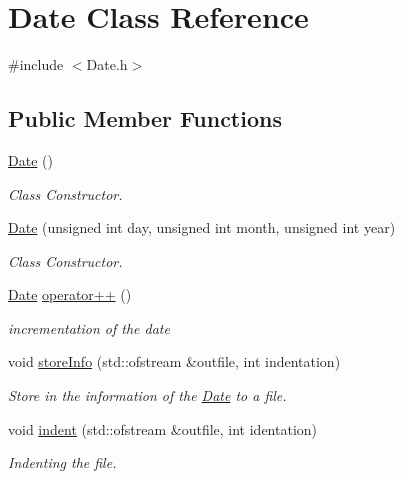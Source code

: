\hypertarget{class_date}{}\section{Date Class Reference}
\label{class_date}


{\ttfamily \#include $<$Date.\+h$>$}

\subsection*{Public Member Functions}
\begin{DoxyCompactItemize}
\item 
\mbox{\label{class_date_a4e59ed4ba66eec61c27460c5d09fa1bd}} 
\mbox{\hyperlink{class_date_a4e59ed4ba66eec61c27460c5d09fa1bd}{Date}} ()
\begin{DoxyCompactList}\small\item\em Class Constructor. \end{DoxyCompactList}\item 
\mbox{\hyperlink{class_date_a28c6604a0f8ed8216becf24abc20cf5b}{Date}} (unsigned int day, unsigned int month, unsigned int year)
\begin{DoxyCompactList}\small\item\em Class Constructor. \end{DoxyCompactList}\item 
\mbox{\hyperlink{class_date}{Date}} \mbox{\hyperlink{class_date_a0c5386da90c6834a3e7a110b02e2abaa}{operator++}} ()
\begin{DoxyCompactList}\small\item\em incrementation of the date \end{DoxyCompactList}\item 
void \mbox{\hyperlink{class_date_a9385a826469d0978e3491bdff9739f6f}{store\+Info}} (std\+::ofstream \&outfile, int indentation)
\begin{DoxyCompactList}\small\item\em Store in the information of the \mbox{\hyperlink{class_date}{Date}} to a file. \end{DoxyCompactList}\item 
void \mbox{\hyperlink{class_date_af439b0bc0daf90fddce7c74017407a16}{indent}} (std\+::ofstream \&outfile, int identation)
\begin{DoxyCompactList}\small\item\em Indenting the file. \end{DoxyCompactList}\item 

\end{DoxyCompactItemize}
